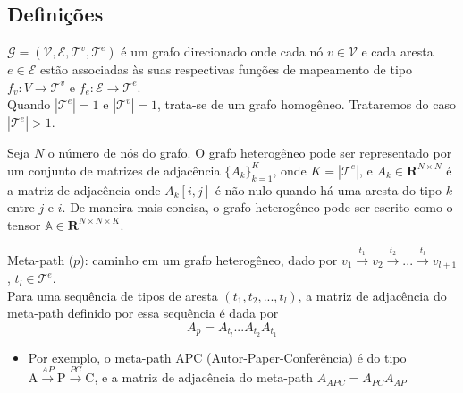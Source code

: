 \documentclass[12pt,notheorems,hyperref={pdfauthor=whatever}]{beamer}
\begin{document}
\subsection{Definições}
\begin{frame}

    \begin{definition}
        $\mathcal{G} = (\mathcal{V}, \mathcal{E}, \mathcal{T}^{v}, \mathcal{T}^{e})$ é um grafo direcionado onde cada nó $v \in \mathcal{V}$ e cada aresta $e \in \mathcal{E}$ estão associadas às suas respectivas funções de mapeamento de tipo $f_v: V \rightarrow \mathcal{T}^v$ e $f_e: \mathcal{E} \rightarrow \mathcal{T}^e$. \\
        
        Quando $|\mathcal{T}^e| = 1$ e $|\mathcal{T}^v| = 1$, trata-se de um grafo homogêneo. Trataremos do caso $|\mathcal{T}^e| > 1$. 

        \vspace{10pt}
        
        Seja $N$ o número de nós do grafo. O grafo heterogêneo pode ser representado por um conjunto de matrizes de adjacência $\{A_k\}^K_{k=1}$, onde $K = |\mathcal{T}^e|$, e $A_k \in \mathbf{R}^{N \times N}$ é a matriz de adjacência onde $A_k[i, j]$ é não-nulo quando há uma aresta do tipo $k$ entre $j$ e $i$. De maneira mais concisa, o grafo heterogêneo pode ser escrito como o tensor $\mathbb{A} \in \mathbf{R}^{N \times N \times K}$.
    \end{definition}

\end{frame}

\begin{frame}

    \begin{definition}
        Meta-path ($p$): caminho em um grafo heterogêneo, dado por 
        $v_1 \xrightarrow{t_1} v_2 \xrightarrow{t_2} ... \xrightarrow{t_l} v_{l+1}$, $t_l \in \mathcal{T}^{e}$. \\
        \vspace{5pt}
        Para uma sequência de tipos de aresta $(t_1, t_2, ..., t_l)$, a matriz de adjacência do meta-path definido por essa sequência é dada por $$A_p= A_{t_l} ... A_{t_2}A_{t_1}$$
    \end{definition}

    \begin{itemize}
        \item     Por exemplo, o meta-path APC (Autor-Paper-Conferência) é do tipo $\text{A}\xrightarrow{AP}\text{P}\xrightarrow{PC}\text{C}$, e a matriz de adjacência do meta-path $A_{APC}=A_{PC}A_{AP}$
    \end{itemize}
\end{frame}
\end{document}
